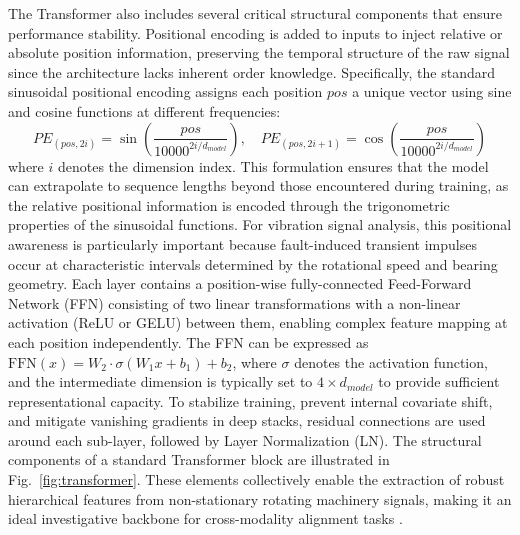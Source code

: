 The Transformer also includes several critical structural components that ensure performance stability. Positional encoding is added to inputs to inject relative or absolute position information, preserving the temporal structure of the raw signal since the architecture lacks inherent order knowledge. Specifically, the standard sinusoidal positional encoding assigns each position $pos$ a unique vector using sine and cosine functions at different frequencies:
\begin{equation}
PE_{(pos, 2i)} = \sin\left(\frac{pos}{10000^{2i/d_{model}}}\right), \quad PE_{(pos, 2i+1)} = \cos\left(\frac{pos}{10000^{2i/d_{model}}}\right)
\end{equation}
where $i$ denotes the dimension index. This formulation ensures that the model can extrapolate to sequence lengths beyond those encountered during training, as the relative positional information is encoded through the trigonometric properties of the sinusoidal functions. For vibration signal analysis, this positional awareness is particularly important because fault-induced transient impulses occur at characteristic intervals determined by the rotational speed and bearing geometry. Each layer contains a position-wise fully-connected Feed-Forward Network (FFN) consisting of two linear transformations with a non-linear activation (ReLU or GELU) between them, enabling complex feature mapping at each position independently. The FFN can be expressed as $\text{FFN}(x) = W_2 \cdot \sigma(W_1 x + b_1) + b_2$, where $\sigma$ denotes the activation function, and the intermediate dimension is typically set to $4 \times d_{model}$ to provide sufficient representational capacity. To stabilize training, prevent internal covariate shift, and mitigate vanishing gradients in deep stacks, residual connections are used around each sub-layer, followed by Layer Normalization (LN). The structural components of a standard Transformer block are illustrated in Fig.~\ref{fig:transformer}. These elements collectively enable the extraction of robust hierarchical features from non-stationary rotating machinery signals, making it an ideal investigative backbone for cross-modality alignment tasks \cite{vaswani2017attention}.


